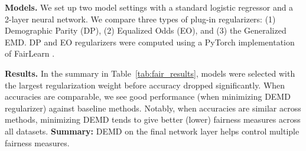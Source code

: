 {\bf Models.} We set up two model settings with a standard logistic regressor and a 2-layer neural network. We compare three types of plug-in regularizers: (1) Demographic Parity (DP), (2) Equalized Odds (EO), and (3) the Generalized EMD. DP and EO regularizers were computed using a PyTorch implementation of FairLearn \citep{bird2020fairlearn}. 

{\bf Results.} In the summary in Table~\ref{tab:fair_results}, models were selected with the largest regularization weight before accuracy dropped significantly. When accuracies are comparable, we see good performance (when minimizing DEMD regularizer) against baseline methods. Notably, when accuracies are similar across methods, minimizing DEMD tends to give better (lower) fairness measures across all datasets.
{\bf Summary:} DEMD on the final network layer helps control multiple fairness measures.




